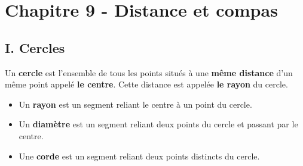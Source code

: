 
\section*{Chapitre 9 - Distance et compas}

\subsection*{I. Cercles}


\begin{Définitions*}[c]

\begin{minipage}[c]{0.65\textwidth}
\vspace{0.2cm}
Un \textbf{cercle} est l'ensemble de tous les points situés à une \textbf{même distance} d'un même point appelé \textbf{le centre}. Cette distance est appelée \textbf{le rayon} du cercle.
\begin{itemize}[label=\textcolor{Couleur6}{$\bullet$}]
\item Un \textbf{rayon} est un segment reliant le centre à un point du cercle.
\item Un \textbf{diamètre} est un segment reliant deux points du cercle et passant par le centre.
\item Une \textbf{corde} est un segment reliant deux points distincts du cercle.
\end{itemize}

\end{minipage} \hfill \begin{minipage}[c]{0.3\textwidth}
\begin{center}
\end{center}
\end{minipage}
\end{Définitions*}
